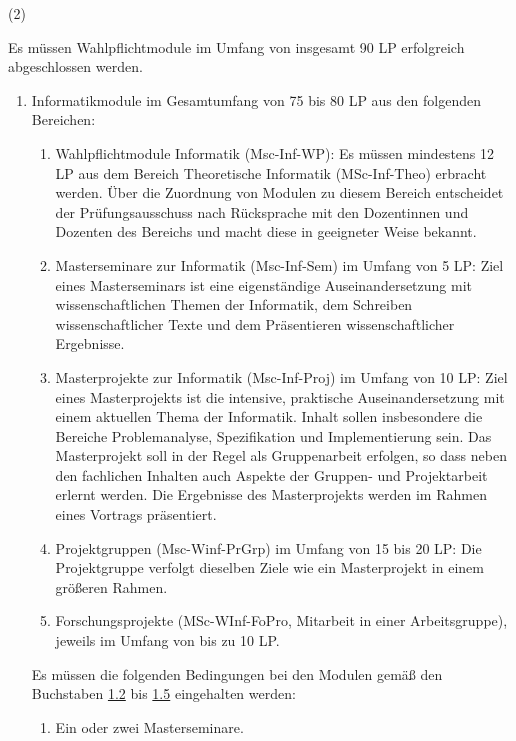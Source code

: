 \documentclass{article}\usepackage{helvet}\renewcommand{\familydefault}{\sfdefault}\usepackage[letterpaper,top=2cm,bottom=2cm,left=3cm,right=3cm,marginparwidth=1.75cm]{geometry}\usepackage[colorlinks=true,allcolors=red]{hyperref}\usepackage{enumitem}\usepackage{tabularx}\usepackage[T1]{fontenc}\setlist[enumerate,1]{label=\arabic*., left=0pt}\setlist[enumerate,2]{label=\alph*., left=0.5em}\setlist[enumerate,3]{label=\alph*\alph*., left=1em}\setlist[enumerate,4]{label=-, left=1.5em}\setlist{nosep}\setlength{\parindent}{0pt}
\begin{document}
	\begin{minipage}[t]
		{2em}
		(2)
	\end{minipage}
\hspace{0.5em}
	\begin{minipage}[t]
		{\dimexpr\linewidth-2em-0.5em\relax}
		Es müssen Wahlpflichtmodule im Umfang von insgesamt 90 LP erfolgreich abgeschlossen werden.
		\begin{enumerate}
			\item{Informatikmodule im Gesamtumfang von 75 bis 80 LP aus den folgenden Bereichen:
			\begin{enumerate}
				\item{Wahlpflichtmodule Informatik (Msc-Inf-WP): Es müssen mindestens 12 LP aus dem Bereich Theoretische Informatik (MSc-Inf-Theo) erbracht werden. Über die Zuordnung von Modulen zu diesem Bereich entscheidet der Prüfungsausschuss nach Rücksprache mit den Dozentinnen und Dozenten des Bereichs und macht diese in geeigneter Weise bekannt.}
				\item{Masterseminare zur Informatik (Msc-Inf-Sem) im Umfang von 5 LP: Ziel eines Masterseminars ist eine eigenständige Auseinandersetzung mit wissenschaftlichen Themen der Informatik, dem Schreiben wissenschaftlicher Texte und dem Präsentieren wissenschaftlicher Ergebnisse.}
				\item{Masterprojekte zur Informatik (Msc-Inf-Proj) im Umfang von 10 LP: Ziel eines Masterprojekts ist die intensive, praktische Auseinandersetzung mit einem aktuellen Thema der Informatik. Inhalt sollen insbesondere die Bereiche Problemanalyse, Spezifikation und Implementierung sein. Das Masterprojekt soll in der Regel als Gruppenarbeit erfolgen, so dass neben den fachlichen Inhalten auch Aspekte der Gruppen- und Projektarbeit erlernt werden. Die Ergebnisse des Masterprojekts werden im Rahmen eines Vortrags präsentiert.}
				\item{Projektgruppen (Msc-Winf-PrGrp) im Umfang von 15 bis 20 LP: Die Projektgruppe verfolgt dieselben Ziele wie ein Masterprojekt in einem größeren Rahmen.}
				\item{Forschungsprojekte (MSc-WInf-FoPro, Mitarbeit in einer Arbeitsgruppe), jeweils im Umfang von bis zu 10 LP.}
			\end{enumerate}
Es müssen die folgenden Bedingungen bei den Modulen gemäß den Buchstaben \hyperlink{numb}{1.2} bis \hyperlink{nume}{1.5} eingehalten werden:
			\begin{enumerate}
				\item{Ein oder zwei Masterseminare.}

\end{enumerate}}
\end{enumerate}
\end{minipage}
\end{document}
